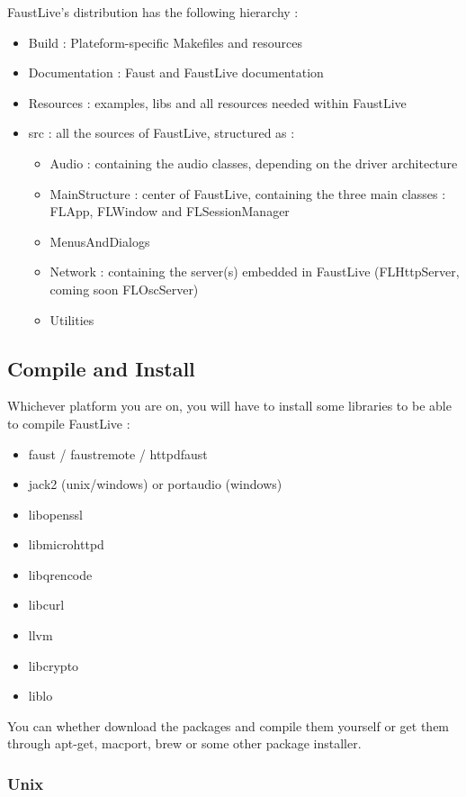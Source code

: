 \documentclass[a4paper]{article}
\begin{document}
{FaustLive's distribution has the following hierarchy :
\begin{itemize}
\item Build : Plateform-specific Makefiles and resources
\item Documentation : Faust and FaustLive documentation
\item Resources : examples, libs and all resources needed within FaustLive
\item src : all the sources of FaustLive, structured as :
\begin{itemize}
\item Audio : containing the audio classes, depending on the driver architecture
\item MainStructure : center of FaustLive, containing the three main classes : FLApp, FLWindow and FLSessionManager
\item MenusAndDialogs
\item Network : containing the server(s) embedded in FaustLive (FLHttpServer, coming soon FLOscServer)
\item Utilities
\end{itemize}
\end{itemize}

\subsection{Compile and Install}

Whichever platform you are on, you will have to install some libraries to be able to compile FaustLive :
\begin{itemize}
\item faust / faustremote / httpdfaust 
\item jack2 (unix/windows) or portaudio (windows)
\item libopenssl
\item libmicrohttpd
\item libqrencode
\item libcurl
\item llvm
\item libcrypto
\item liblo
\end{itemize}

You can whether download the packages and compile them yourself or get them through apt-get, macport, brew or some other package installer. 

\subsubsection{Unix}

}
\end{document}
